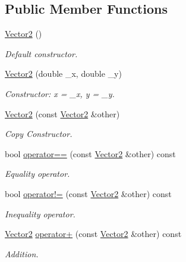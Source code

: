\subsection*{Public Member Functions}
\begin{DoxyCompactItemize}
\item 
\mbox{\hyperlink{struct_vector2_a22104d1809be26a419ef1f959e3761bf}{Vector2}} ()
\begin{DoxyCompactList}\small\item\em Default constructor. \end{DoxyCompactList}\item 
\mbox{\hyperlink{struct_vector2_a861062b13bd0e92d50b3ffd90c9edd77}{Vector2}} (double \+\_\+x, double \+\_\+y)
\begin{DoxyCompactList}\small\item\em Constructor\+: x = \+\_\+x, y = \+\_\+y. \end{DoxyCompactList}\item 
\mbox{\hyperlink{struct_vector2_ac0c70e89b089fb619dae62c32ccde4ec}{Vector2}} (const \mbox{\hyperlink{struct_vector2}{Vector2}} \&other)
\begin{DoxyCompactList}\small\item\em Copy Constructor. \end{DoxyCompactList}\item 
bool \mbox{\hyperlink{struct_vector2_a75c903883dd1c8c6e39f83b3c0f1c6ab}{operator==}} (const \mbox{\hyperlink{struct_vector2}{Vector2}} \&other) const
\begin{DoxyCompactList}\small\item\em Equality operator. \end{DoxyCompactList}\item 
bool \mbox{\hyperlink{struct_vector2_af3b049c981a79bd60495b6362aa6392b}{operator!=}} (const \mbox{\hyperlink{struct_vector2}{Vector2}} \&other) const
\begin{DoxyCompactList}\small\item\em Inequality operator. \end{DoxyCompactList}\item 
\mbox{\hyperlink{struct_vector2}{Vector2}} \mbox{\hyperlink{struct_vector2_a53bdaa4ea8e1504f8a78ac78e6f151bf}{operator+}} (const \mbox{\hyperlink{struct_vector2}{Vector2}} \&other) const
\begin{DoxyCompactList}\small\item\em Addition. \end{DoxyCompactList}\item 

\end{DoxyCompactItemize}
